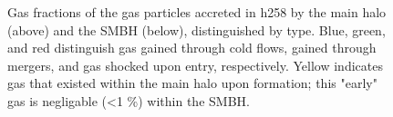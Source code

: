 \documentclass[manuscript]{aastex}
\begin{document}
\begin{figure}
\centerline{}
\centerline{}
\caption[]{Gas fractions of the gas particles accreted in h258 by the main halo (above) and the SMBH (below), distinguished by type. Blue, green, and red distinguish gas gained through cold flows, gained through mergers, and gas shocked upon entry, respectively. Yellow indicates gas that existed within the main halo upon formation; this "early" gas is negligable (<1 \%) within the SMBH.}
\label{h277piefrac} 
\end{figure}
\end{document}
